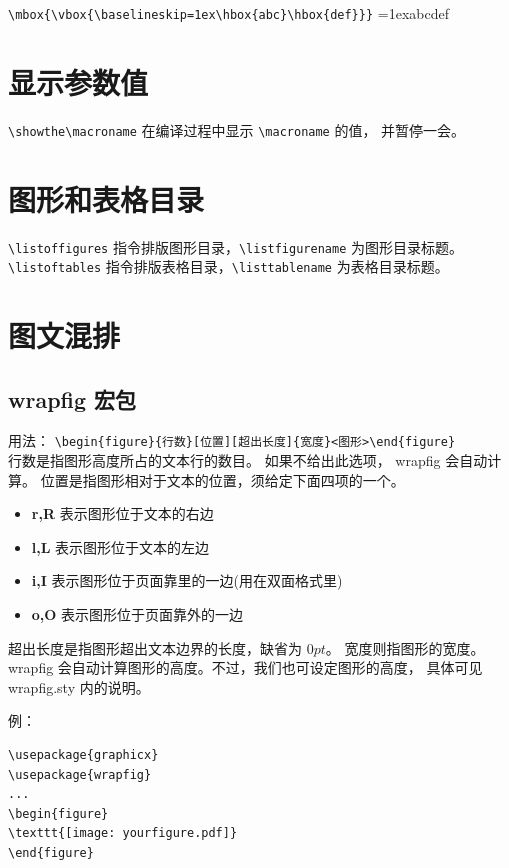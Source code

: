 \documentclass[a4paper,11pt]{article}
\begin{document}
\verb+\mbox{\vbox{\baselineskip=1ex\hbox{abc}\hbox{def}}}+\hspace{2em}
\mbox{\vbox{\baselineskip=1ex\hbox{abc}\hbox{def}}}

\section{显示参数值}
\verb+\showthe\macroname+ 在编译过程中显示 \verb+\macroname+ 的值，
并暂停一会。


\section{图形和表格目录}
\verb+\listoffigures+ 指令排版图形目录，\verb+\listfigurename+
为图形目录标题。\\
\verb+\listoftables+ 指令排版表格目录，\verb+\listtablename+
为表格目录标题。

\section{图文混排}
\subsection{wrapfig 宏包}
用法：%
\verb+\begin{figure}{行数}[位置][超出长度]{宽度}<图形>\end{figure}+\\
行数是指图形高度所占的文本行的数目。 如果不给出此选项，
wrapfig 会自动计算。 位置是指图形相对于文本的位置，须给定下面四项的一个。
\begin{itemize}
	\item {\bf r,R} 表示图形位于文本的右边
	\item {\bf l,L} 表示图形位于文本的左边
	\item {\bf i,I} 表示图形位于页面靠里的一边(用在双面格式里)
	\item {\bf o,O} 表示图形位于页面靠外的一边
\end{itemize}
超出长度是指图形超出文本边界的长度，缺省为 $0pt$。 宽度则指图形的宽度。
wrapfig 会自动计算图形的高度。不过，我们也可设定图形的高度，
具体可见 wrapfig.sty 内的说明。

例：
\begin{Verbatim}
\usepackage{graphicx}
\usepackage{wrapfig}
...
\begin{figure}
\texttt{[image: yourfigure.pdf]}
\end{figure}
\end{Verbatim}
\end{document}
